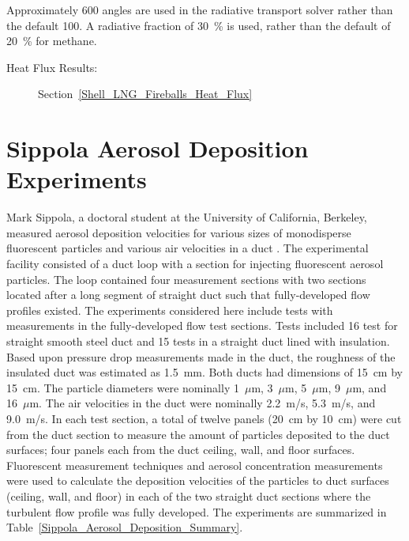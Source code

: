 Approximately 600 angles are used in the radiative transport solver rather than the default 100. A radiative fraction of 30~\% is used, rather than the default of 20~\% for methane.

\begin{description}
\item[Heat Flux Results:] Section~\ref{Shell_LNG_Fireballs_Heat_Flux} 
\end{description}

\FloatBarrier



\section{Sippola Aerosol Deposition Experiments}
\label{Sippola_Aerosol_Deposition_Description}

Mark Sippola, a doctoral student at the University of California, Berkeley, measured aerosol deposition velocities for various sizes of monodisperse fluorescent particles and various air velocities in a duct \cite{Sippola:2002,Sippola:2010}. The experimental facility consisted of a duct loop with a section for injecting fluorescent aerosol particles. The loop contained four measurement sections with two sections located after a long segment of straight duct such that fully-developed flow profiles existed. The experiments considered here include tests with measurements in the fully-developed flow test sections. Tests included 16 test for straight smooth steel duct and 15 tests in a straight duct lined with insulation. Based upon pressure drop measurements made in the duct, the roughness of the insulated duct was estimated as 1.5~mm. Both ducts had dimensions of 15~cm by 15~cm. The particle diameters were nominally 1~$\mu$m, 3~$\mu$m, 5~$\mu$m, 9~$\mu$m, and 16~$\mu$m. The air velocities in the duct were nominally 2.2~m/s, 5.3~m/s, and 9.0~m/s. In each test section, a total of twelve panels (20~cm by 10~cm) were cut from the duct section to measure the amount of particles deposited to the duct surfaces; four panels each from the duct ceiling, wall, and floor surfaces. Fluorescent measurement techniques and aerosol concentration measurements were used to calculate the deposition velocities of the particles to duct surfaces (ceiling, wall, and floor) in each of the two straight duct sections where the turbulent flow profile was fully developed. The experiments are summarized in Table~\ref{Sippola_Aerosol_Deposition_Summary}.

